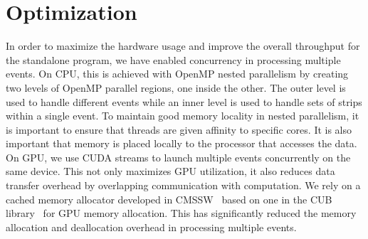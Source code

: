 \documentclass[10pt, paper=a4, UKenglish]{article}
\begin{document}
\section{Optimization}
\label{opt}
In order to maximize the hardware usage and improve the overall throughput for the standalone program, we have enabled concurrency in processing multiple events. On CPU, this is achieved with OpenMP nested parallelism by creating two levels of OpenMP parallel regions, one inside the other. The outer level is used to handle different events while an inner level is used to handle sets of strips within a single event. To maintain good memory locality in nested parallelism, it is important to ensure that threads are given affinity to specific cores. It is also important that memory is placed locally to the processor that accesses the data. On GPU, we use CUDA streams to launch multiple events concurrently on the same device. This not only maximizes GPU utilization, it also reduces data transfer overhead by overlapping communication with computation. We rely on a cached memory allocator developed in CMSSW~\cite{2020arXiv200404334B} based on one in the CUB library~\cite{cub} for GPU memory allocation. This has significantly reduced the memory allocation and deallocation overhead in processing multiple events. 
\end{document}

